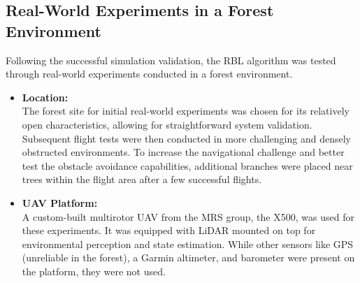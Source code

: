         \subsection{Real-World Experiments in a Forest Environment}
            Following the successful simulation validation, the \ac{RBL} algorithm was tested through real-world experiments conducted in a forest environment.
            \begin{itemize}
                \item \textbf{Location: } \\
                    The forest site for initial real-world experiments was chosen for its relatively open characteristics, allowing for straightforward system validation. 
                    Subsequent flight tests were then conducted in more challenging and densely obstructed environments.
                    To increase the navigational challenge and better test the obstacle avoidance capabilities, additional branches were placed near trees within the flight area after a few successful flights. 
                \item \textbf{UAV Platform: } \\
                    A custom-built multirotor \ac{UAV} from the \ac{MRS} group, the X500, was used for these experiments.
                    It was equipped with \ac{LiDAR} mounted on top for environmental perception and state estimation.
                    While other sensors like \ac{GPS} (unreliable in the forest), a Garmin altimeter, and barometer were present on the platform, they were not used.

\end{itemize}
